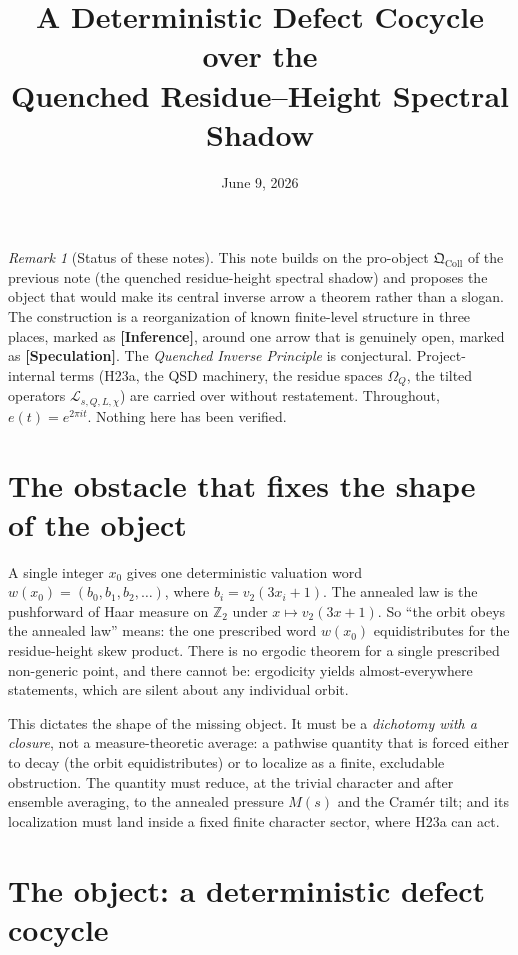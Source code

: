 \documentclass[11pt]{article}
\title{A Deterministic Defect Cocycle over the\\
Quenched Residue--Height Spectral Shadow}
\author{}
\date{June 9, 2026}
\newcommand{\Z}{\mathbb{Z}}
\newcommand{\Lcal}{\mathcal{L}}
\newcommand{\Om}{\Omega}
\newcommand{\Qcoll}{\mathfrak{Q}_{\mathrm{Coll}}}
\newcommand{\epi}[1]{{\small\sffamily\textbf{[#1]}}}
\theoremstyle{remark}
\newtheorem*{remark}{Remark}
\begin{document}
\maketitle

\begin{remark}[Status of these notes]
This note builds on the pro-object $\Qcoll$ of the previous note (the quenched
residue-height spectral shadow) and proposes the object that would make its central
inverse arrow a theorem rather than a slogan. The construction is a reorganization of
known finite-level structure in three places, marked as \epi{Inference}, around one arrow
that is genuinely open, marked as \epi{Speculation}. The \emph{Quenched Inverse Principle}
is conjectural. Project-internal terms (\textsf{H23a}, the QSD machinery, the residue
spaces $\Om_Q$, the tilted operators $\Lcal_{s,Q,L,\chi}$) are carried over without
restatement. Throughout, $e(t) = e^{2\pi i t}$. Nothing here has been verified.
\end{remark}

\section{The obstacle that fixes the shape of the object}

A single integer $x_0$ gives one deterministic valuation word
$w(x_0) = (b_0, b_1, b_2, \dots)$, where $b_i = v_2(3x_i + 1)$. The annealed law is the
pushforward of Haar measure on $\Z_2$ under $x \mapsto v_2(3x+1)$. So ``the orbit obeys the
annealed law'' means: the one prescribed word $w(x_0)$ equidistributes for the
residue-height skew product. There is no ergodic theorem for a single prescribed
non-generic point, and there cannot be: ergodicity yields almost-everywhere statements,
which are silent about any individual orbit.

This dictates the shape of the missing object. It must be a \emph{dichotomy with a
closure}, not a measure-theoretic average: a pathwise quantity that is forced either to
decay (the orbit equidistributes) or to localize as a finite, excludable obstruction. The
quantity must reduce, at the trivial character and after ensemble averaging, to the
annealed pressure $M(s)$ and the Cram\'er tilt; and its localization must land inside a
fixed finite character sector, where \textsf{H23a} can act.

\section{The object: a deterministic defect cocycle}
\end{document}
